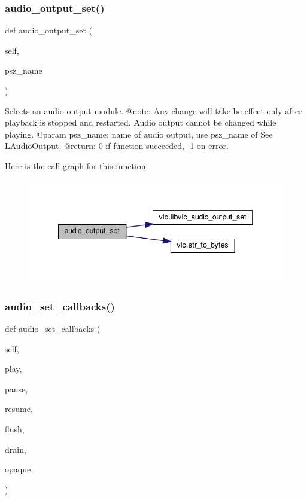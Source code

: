\subsubsection{\texorpdfstring{audio\+\_\+output\+\_\+set()}{audio\_output\_set()}}
{\footnotesize\ttfamily def audio\+\_\+output\+\_\+set (\begin{DoxyParamCaption}\item[{}]{self,  }\item[{}]{psz\+\_\+name }\end{DoxyParamCaption})}

\begin{DoxyVerb}Selects an audio output module.
@note: Any change will take be effect only after playback is stopped and
restarted. Audio output cannot be changed while playing.
@param psz_name: name of audio output, use psz_name of See L{AudioOutput}.
@return: 0 if function succeeded, -1 on error.
\end{DoxyVerb}
 Here is the call graph for this function\+:
\nopagebreak
\begin{figure}[H]
\begin{center}
\leavevmode
\includegraphics[width=341pt]{classvlc_1_1_media_player_afe8f532333eb1d961d285d3bb74df20c_cgraph}
\end{center}
\end{figure}
\mbox{\label{classvlc_1_1_media_player_a327e9a7e6662ac47c17b3495a506ef38}} 
\subsubsection{\texorpdfstring{audio\+\_\+set\+\_\+callbacks()}{audio\_set\_callbacks()}}
{\footnotesize\ttfamily def audio\+\_\+set\+\_\+callbacks (\begin{DoxyParamCaption}\item[{}]{self,  }\item[{}]{play,  }\item[{}]{pause,  }\item[{}]{resume,  }\item[{}]{flush,  }\item[{}]{drain,  }\item[{}]{opaque }\end{DoxyParamCaption})}

